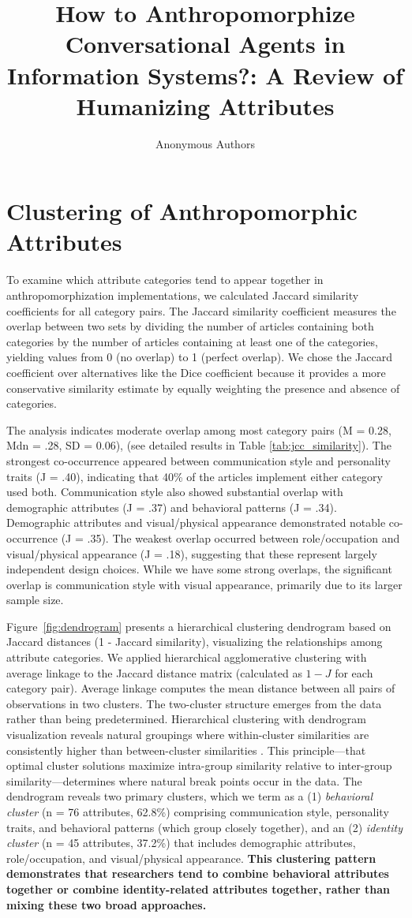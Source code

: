 \documentclass{article}
\author[1]{Anonymous Authors}
\title{How to Anthropomorphize Conversational Agents in Information Systems?: A Review of Humanizing Attributes}
\begin{document}
\section*{Clustering of Anthropomorphic Attributes}
To examine which attribute categories tend to appear together in anthropomorphization implementations, we calculated Jaccard similarity coefficients for all category pairs. The Jaccard similarity coefficient measures the overlap between two sets by dividing the number of articles containing both categories by the number of articles containing at least one of the categories, yielding values from 0 (no overlap) to 1 (perfect overlap). We chose the Jaccard coefficient over alternatives like the Dice coefficient because it provides a more conservative similarity estimate by equally weighting the presence and absence of categories.

The analysis indicates moderate overlap among most category pairs (M = 0.28, Mdn = .28, SD = 0.06), (see detailed results in Table \ref{tab:jcc_similarity}). The strongest co-occurrence appeared between communication style and personality traits (J = .40), indicating that 40\% of the articles implement either category used both. Communication style also showed substantial overlap with demographic attributes (J = .37) and behavioral patterns (J = .34). Demographic attributes and visual/physical appearance demonstrated notable co-occurrence (J = .35). %
The weakest overlap occurred between role/occupation and visual/physical appearance (J = .18), suggesting that these represent largely independent design choices. While we have some strong overlaps, the significant overlap is communication style with visual appearance, primarily due to its larger sample size.


Figure~\ref{fig:dendrogram} presents a hierarchical clustering dendrogram based on Jaccard distances (1 - Jaccard similarity), visualizing the relationships among attribute categories. We applied hierarchical agglomerative clustering with average linkage to the Jaccard distance matrix (calculated as $1 - J$ for each category pair). Average linkage computes the mean distance between all pairs of observations in two clusters. The two-cluster structure emerges from the data rather than being predetermined. Hierarchical clustering with dendrogram visualization reveals natural groupings where within-cluster similarities are consistently higher than between-cluster similarities \citep{tibshirani2001estimating}. This principle---that optimal cluster solutions maximize intra-group similarity relative to inter-group similarity---determines where natural break points occur in the data. The dendrogram reveals two primary clusters, which we term as a (1) \textit{behavioral cluster} (n = 76 attributes, 62.8\%) comprising communication style, personality traits, and behavioral patterns (which group closely together), and an (2) \textit{identity cluster} (n = 45 attributes, 37.2\%) that includes demographic attributes, role/occupation, and visual/physical appearance. \textbf{This clustering pattern demonstrates that researchers tend to combine behavioral attributes together or combine identity-related attributes together, rather than mixing these two broad approaches.}
\end{document}
